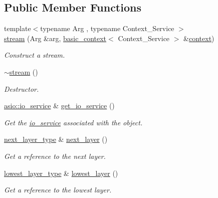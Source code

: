 \subsection*{Public Member Functions}
\begin{DoxyCompactItemize}
\item 
{\footnotesize template$<$typename Arg , typename Context\+\_\+\+Service $>$ }\\\hyperlink{classasio_1_1ssl_1_1old_1_1stream_a9dba46a8e681a91084c5b38734fc380f}{stream} (Arg \&arg, \hyperlink{classasio_1_1ssl_1_1old_1_1basic__context}{basic\+\_\+context}$<$ Context\+\_\+\+Service $>$ \&\hyperlink{classasio_1_1ssl_1_1context}{context})
\begin{DoxyCompactList}\small\item\em Construct a stream. \end{DoxyCompactList}\item 
\hyperlink{classasio_1_1ssl_1_1old_1_1stream_ab930e318ba05be52b65007769a9e2409}{$\sim$stream} ()
\begin{DoxyCompactList}\small\item\em Destructor. \end{DoxyCompactList}\item 
\hyperlink{classasio_1_1io__service}{asio\+::io\+\_\+service} \& \hyperlink{classasio_1_1ssl_1_1old_1_1stream_ad5f0be52be35bcef5ac6ae3d42f0f592}{get\+\_\+io\+\_\+service} ()
\begin{DoxyCompactList}\small\item\em Get the \hyperlink{classasio_1_1io__service}{io\+\_\+service} associated with the object. \end{DoxyCompactList}\item 
\hyperlink{classasio_1_1ssl_1_1old_1_1stream_a71ae7adcbd44cae6750157541c2ddf8e}{next\+\_\+layer\+\_\+type} \& \hyperlink{classasio_1_1ssl_1_1old_1_1stream_a32040331ac2eb6aa5098aa02316bb9d8}{next\+\_\+layer} ()
\begin{DoxyCompactList}\small\item\em Get a reference to the next layer. \end{DoxyCompactList}\item 
\hyperlink{classasio_1_1ssl_1_1old_1_1stream_a6b664149066b698269db4e2f4e846ca2}{lowest\+\_\+layer\+\_\+type} \& \hyperlink{classasio_1_1ssl_1_1old_1_1stream_ac48e43adf4001a1a318d76213fd7186d}{lowest\+\_\+layer} ()
\begin{DoxyCompactList}\small\item\em Get a reference to the lowest layer. \end{DoxyCompactList}\item 

\end{DoxyCompactItemize}
